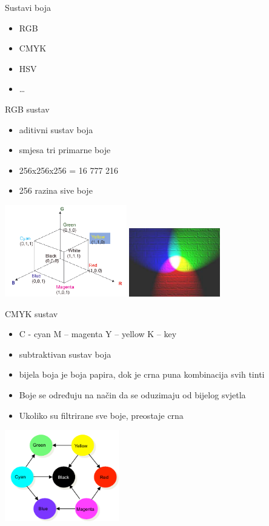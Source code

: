 \documentclass[9pt]{beamer}
\begin{document}
\begin{frame}{Sustavi boja}
	\begin{itemize}
		\item RGB
		\item CMYK
		\item HSV
		\item \ldots
	\end{itemize}
\end{frame}

\begin{frame}{RGB sustav}
	\begin{itemize}
		\item aditivni sustav boja
		\item smjesa tri primarne boje
		\item 256x256x256 = 16 777 216
		\item 256 razina sive boje
	\end{itemize}
	\begin{center}
		\includegraphics[height=4cm]{slike/03_rgb_01.png}
		\includegraphics[height=3cm]{slike/03_rgb_02.png}
	\end{center}
\end{frame}

\begin{frame}{CMYK sustav}
	\begin{itemize}
		\item C - cyan M – magenta Y – yellow K – key
		\item subtraktivan sustav boja
		\item bijela boja je boja papira, dok je crna puna kombinacija svih tinti
		\item Boje se određuju na način da se oduzimaju od bijelog svjetla
		\item Ukoliko su filtrirane sve boje, preostaje crna
	\end{itemize}
	\begin{center}
		\includegraphics[height=4cm]{slike/cmyk.png}
	\end{center}
\end{frame}
\end{document}

